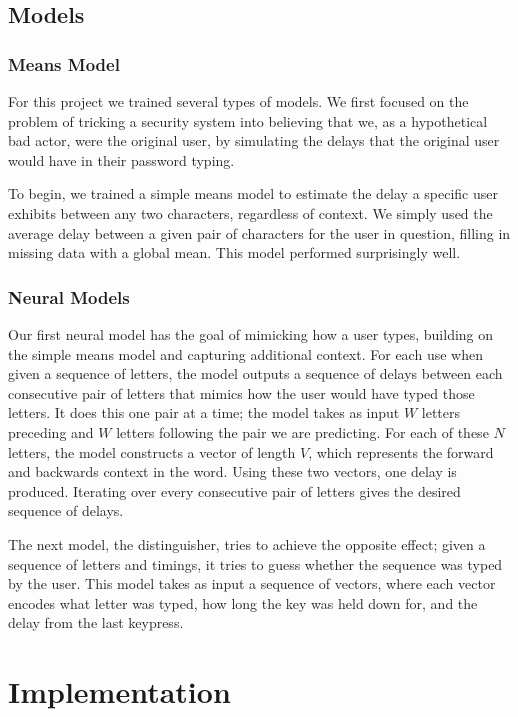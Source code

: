 \documentclass[9pt,journal]{IEEEtran}
\begin{document}
\subsection{Models}
\subsubsection{Means Model}
For this project we trained several types of models. We first focused on the problem of tricking a security system into believing that we, as a hypothetical bad actor, were the original user, by simulating the delays that the original user would have in their password typing.

To begin, we trained a simple means model to estimate the delay a specific user exhibits between any two characters, regardless of context. We simply used the average delay between a given pair of characters for the user in question, filling in missing data with a global mean. This model performed surprisingly well.

\subsubsection{Neural Models}
Our first neural model has the goal of mimicking how a user types, building on the simple means model and capturing additional context. For each use when given a sequence of letters, the model outputs a sequence of delays between each consecutive pair of letters that mimics how the user would have typed those letters. It does this one pair at a time; the model takes as input $W$ letters preceding and $W$ letters following the pair we are predicting. For each of these $N$ letters, the model constructs a vector of length $V$, which represents the forward and backwards context in the word. Using these two vectors, one delay is produced. Iterating over every consecutive pair of letters gives the desired sequence of delays.

The next model, the distinguisher, tries to achieve the opposite effect; given a sequence of letters and timings, it tries to guess whether the sequence was typed by the user. This model takes as input a sequence of vectors, where each vector encodes what letter was typed, how long the key was held down for, and the delay from the last keypress.

\section{Implementation}
\end{document}
